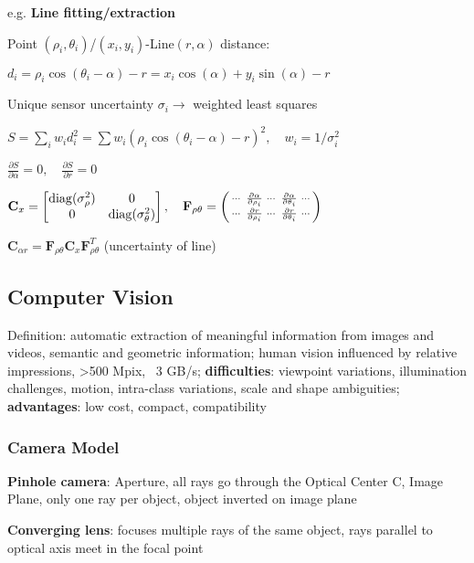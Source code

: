 \documentclass[fontsize=6pt]{scrartcl}
\newcommand{\mat}[1]{\mathbf{#1}}
\begin{document}
\begin{multicols*}{4}
e.g. \textbf{Line fitting/extraction}

Point $(\rho_i, \theta_i)$/$(x_i, y_i)$-Line$(r, \alpha)$ distance:

$d_i = \rho_i \cos(\theta_i - \alpha) -r = x_i\cos(\alpha) + y_i\sin(\alpha) - r$

Unique sensor uncertainty $\sigma_i \rightarrow$ weighted least squares

$S = \sum_i w_i d_i^2 = \sum w_i(\rho_i \cos(\theta_i - \alpha) -r )^2, \quad w_i = 1/\sigma_i^2$

$\frac{\partial S}{\partial \alpha} = 0,\quad \frac{\partial S}{\partial r} = 0$

$\mat C_x = 
\begin{bmatrix}
\diag(\sigma_\rho^2) & 0\\
0 & \diag(\sigma_\theta^2)
\end{bmatrix},
\quad
\mat F_{\rho\theta} =
\left(
\begin{smallmatrix}
\cdots & \frac{\partial \alpha}{\partial \rho_i} & \cdots & \frac{\partial \alpha}{\partial \theta_i} & \cdots\\
\cdots & \frac{\partial r}{\partial \rho_i} & \cdots & \frac{\partial r}{\partial \theta_i} & \cdots
\end{smallmatrix}
\right)
$

$\mat C_{\alpha r} = \mat F_{\rho \theta} \mat C_x \mat F_{\rho \theta}^T$ (uncertainty of line)

\subsection*{Computer Vision}

Definition: automatic extraction of meaningful information from images and videos, semantic and geometric information;
human vision influenced by relative impressions, >500 Mpix, ~3 GB/s;
\textbf{difficulties}: viewpoint variations, illumination challenges, motion, intra-class variations, scale and shape ambiguities;
\textbf{advantages}:	low cost, compact, compatibility


\subsubsection*{Camera Model}

\textbf{Pinhole camera}: Aperture, all rays go through the Optical Center C, Image Plane, only one ray per object, object inverted on image plane

\textbf{Converging lens}: focuses multiple rays of the same object, rays parallel to optical axis meet in the focal point



\end{multicols*}
\end{document}
